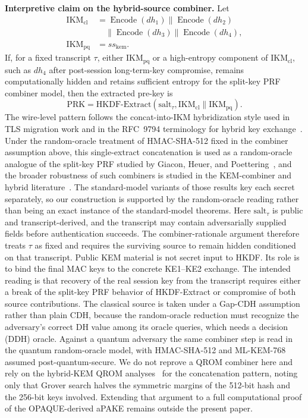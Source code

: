 \documentclass{ieeeijc}
\theoremstyle{remark}
\begin{document}
\medskip
\noindent\textbf{Interpretive claim on the hybrid-source combiner.}
Let
\[
  \begin{aligned}
    \mathrm{IKM}_{\mathrm{cl}}
      &= \operatorname{Encode}(dh_1) \| \operatorname{Encode}(dh_2)\\
      &\quad \| \operatorname{Encode}(dh_3) \|
        \operatorname{Encode}(dh_4),\\
    \mathrm{IKM}_{\mathrm{pq}} &= ss_{\mathrm{kem}}.
  \end{aligned}
\]
If, for a fixed transcript $\tau$, either $\mathrm{IKM}_{\mathrm{pq}}$ or a
high-entropy component of $\mathrm{IKM}_{\mathrm{cl}}$, such as $dh_4$ after
post-session long-term-key compromise, remains computationally hidden and
retains sufficient entropy for the split-key PRF combiner model, then the
extracted pre-key is
\[
  \mathrm{PRK} =
  \mathrm{HKDF\text{-}Extract}(\mathrm{salt}_{\tau},
    \mathrm{IKM}_{\mathrm{cl}} \| \mathrm{IKM}_{\mathrm{pq}}).
\]
The wire-level pattern follows the concat-into-IKM hybridization style used
in TLS migration work and in the RFC~9794 terminology for hybrid key
exchange~\cite{stebila2024,rfc9794}. Under the random-oracle treatment of HMAC-SHA-512 fixed in the combiner
assumption above, this single-extract concatenation is used as a random-oracle
analogue of the split-key PRF studied by Giacon, Heuer, and Poettering~\cite{giacon2018}, and the broader
robustness of such combiners is studied in the KEM-combiner and hybrid
literature~\cite{giacon2018,bindel2019}. The standard-model variants of those
results key each secret separately, so our construction is supported by the
random-oracle reading rather than being an exact instance of the standard-model
theorems.
Here $\mathrm{salt}_{\tau}$ is public and transcript-derived, and the
transcript may contain adversarially supplied fields before authentication
succeeds. The combiner-rationale argument therefore treats $\tau$ as fixed
and requires the surviving source to remain hidden conditioned on that
transcript. Public KEM material is not secret input to HKDF. Its role is to
bind the final MAC keys to the concrete KE1--KE2 exchange. The intended
reading is that recovery of the real session key from the transcript
requires either a break of the split-key PRF behavior of HKDF-Extract or
compromise of both source contributions. The classical source is taken under a
Gap-CDH assumption rather than plain CDH, because the random-oracle reduction
must recognize the adversary's correct DH value among its oracle queries, which
needs a decision (DDH) oracle. Against a quantum adversary the same combiner step
is read in the quantum random-oracle model, with HMAC-SHA-512 and ML-KEM-768
assumed post-quantum-secure. We do not reprove a QROM combiner here and rely on
the hybrid-KEM QROM analyses~\cite{bindel2019} for the concatenation pattern,
noting only that Grover search halves the symmetric margins of the 512-bit hash
and the 256-bit keys involved. Extending
that argument to a full computational proof of the OPAQUE-derived aPAKE remains
outside the present paper.
\end{document}
